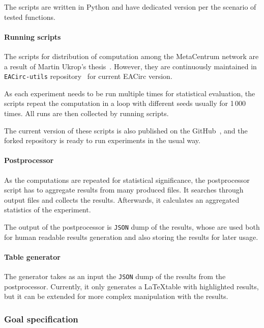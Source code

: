 \documentclass[
  print, %
  Table,   %
  nolof,     %
  nolot,     %
  11pt, %
  oneside  %
]{fithesis3}
\begin{document}
The scripts are written in Python and have dedicated version per the scenario of tested functions.

\paragraph{Running scripts}

The scripts for distribution of computation among the MetaCentrum network are a result of Martin Ukrop's thesis~\cite{ukropMgrThesis}. However, they are continuously maintained in \texttt{EACirc-utils} repository~\cite{eaUtils} for current EACirc version.

As each experiment needs to be run multiple times for statistical evaluation, the scripts repeat the computation in a loop with different seeds usually for 1\,000 times. All runs are then collected by running scripts.

The current version of these scripts is also published on the GitHub~\cite{eaUtils}, and the forked repository is ready to run experiments in the usual way.

\paragraph{Postprocessor}

As the computations are repeated for statistical significance, the postprocessor script has to aggregate results from many produced files. It searches through output files and collects the results. Afterwards, it calculates an aggregated statistics of the experiment.

The output of the postprocessor is \texttt{JSON} dump of the results, whose are used both for human readable results generation and also storing the results for later usage.

\paragraph{Table generator}

The generator takes as an input the \texttt{JSON} dump of the results from the postprocessor. Currently, it only generates a \LaTeX table with highlighted results, but it can be extended for more complex manipulation with the results.

\subsubsection{Goal specification}
\label{subsubsec:method-spec-ss-goal}
\end{document}
